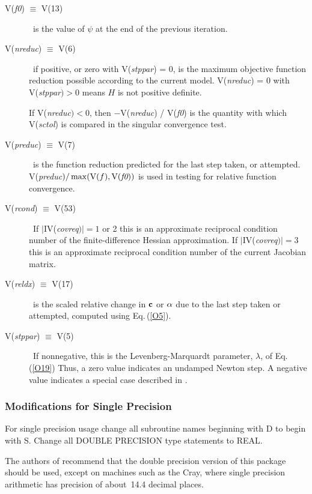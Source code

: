 \documentclass[twoside]{MATH77}
\begin{document}
\begin{description}
\item[V({\em f0}) $\equiv $ V(13)]  \ is the value of $\psi $ at the end of the
previous iteration.

\item[V({\em nreduc}) $\equiv $ V(6)]  \ if positive, or zero with V({\em stppar}) = 0,
is the maximum objective function reduction possible according to the
current model. V({\em nreduc}) = 0 with V({\em stppar}$)>0$ means $H$ is not positive
definite.

If V({\em nreduc}$)<0$, then $-$V({\em nreduc}) / V({\em f0}) is the quantity with which
V({\em sctol}) is compared in the singular convergence test.

\item[V({\em preduc}) $\equiv $ V(7)]  \ is the function reduction predicted for
the last step taken, or attempted. V({\em preduc}$)/\max (\text{V}(f),
\text{V({\em f0})})$ is
used in testing for relative function convergence.

\item[V({\em rcond}) $\equiv $ V(53)]  \ If $|$IV({\em covreq}$)|=1$ or 2 this is an
approximate reciprocal condition number of the finite-difference Hessian
approximation. If $|$IV({\em covreq}$)|=3$ this is an approximate reciprocal
condition number of the current Jacobian matrix.

\item[V({\em reldx}) $\equiv $ V(17)]  \ is the scaled relative change in ${\bf c}$
or ${\bf \alpha }$ due to the last step taken or attempted, computed using
Eq.\,(\ref{O5}).

\item[V({\em stppar}) $\equiv $ V(5)]  \ If nonnegative, this is the
Levenberg-Marquardt parameter, $\lambda $, of Eq.\,(\ref{O19}) Thus, a zero
value indicates an undamped Newton step. A negative value indicates a
special case described in \cite{Gay:1981:COL}.
\end{description}

\subsubsection{Modifications for Single Precision\label{PB5}}

For single precision usage change all subroutine names beginning with D to
begin with S. Change all DOUBLE PRECISION type statements to REAL.

The authors of \cite{Dennis:1981:ANL} recommend that the double precision
version of this package should be used, except on machines such as the
Cray, where single precision arithmetic has precision of about~14.4
decimal places.
\end{document}
